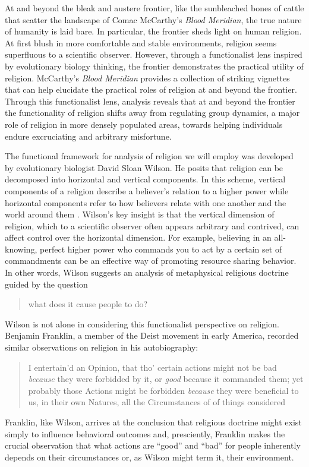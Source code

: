 At and beyond the bleak and austere frontier, like the sunbleached bones of cattle that scatter the landscape of Comac McCarthy's \textit{Blood Meridian}, the true nature of humanity is laid bare.
In particular, the frontier sheds light on human religion.
At first blush in more comfortable and stable environments, religion seems superfluous to a scientific observer.
However, through a functionalist lens inspired by evolutionary biology thinking, the frontier demonstrates the practical utility of religion.
McCarthy's \textit{Blood Meridian} provides a collection of striking vignettes that can help elucidate the practical roles of religion at and beyond the frontier.
Through this functionalist lens, analysis reveals that at and beyond the frontier the functionality of religion shifts away from regulating group dynamics, a major role of religion in more densely populated areas, towards helping individuals endure excruciating and arbitrary misfortune.

The functional framework for analysis of religion we will employ was developed by evolutionary biologist David Sloan Wilson.
He posits that religion can be decomposed into horizontal and vertical components.
In this scheme, vertical components of a religion describe a believer's relation to a higher power while horizontal components refer to how believers relate with one another and the world around them \cite[p 255]{Wilson2007EvolutionLives}.
Wilson's key insight is that the vertical dimension of religion, which to a scientific observer often appears arbitrary and contrived, can affect control over the horizontal dimension.
For example, believing in an all-knowing, perfect higher power who commands you to act by a certain set of commandments can be an effective way of promoting resource sharing behavior.
In other words, Wilson suggests an analysis of metaphysical religious doctrine guided by the question \blockcquote[p 256]{Wilson2007EvolutionLives}{
what does it cause people to do?
}.
Wilson is not alone in considering this functionalist perspective on religion.
Benjamin Franklin, a member of the Deist movement in early America, recorded similar observations on religion in his autobiography:
\blockcquote[p 59]{Franklin2008AutobiographyWritings}{
I entertain'd an Opinion, that tho' certain actions might not be bad \textit{because} they were forbidded by it, or \textit{good} because it commanded them; yet probably those Actions might be forbidden \textit{because} they were beneficial to us, in their own Natures, all the Circumstances of of things considered
}.
Franklin, like Wilson, arrives at the conclusion that religious doctrine might exist simply to influence behavioral outcomes and, presciently, Franklin makes the crucial observation that what actions are ``good'' and ``bad'' for people inherently depends on their circumstances or, as Wilson might term it, their environment.
